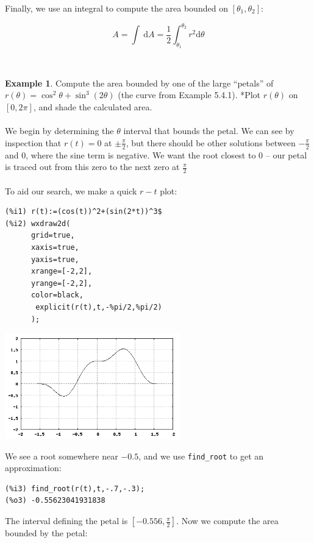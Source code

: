 \documentclass[10.5pt,twoside]{report}
\theoremstyle{definition}
\newtheorem{exmp}{Example}[section]
\begin{document}
Finally, we use an integral to compute the area bounded on $[\theta_1,\theta_2]$:

\[A=\int\ \mathrm{d}A =\frac{1}{2} \int_{\theta_1}^{\theta_2} r^2 \mathrm{d}\theta\]

${}$\\

\begin{exmp} Compute the area bounded by one of the large ``petals'' of $r(\theta)=\cos^2{\theta}+\sin^3{(2\theta)}$ (the curve from Example 5.4.1).  *Plot $r(\theta)$ on $[0,2\pi]$, and shade the calculated area.  \\

${}$\\

We begin by determining the $\theta$ interval that bounds the petal.  We can see by inspection that $r(t)=0$ at $\pm \frac{\pi}{2}$, but there should be other solutions between $-\frac{\pi}{2}$ and $0$, where the sine term is negative.  We want the root closest to $0$ -- our petal is traced out from this zero to the next zero at $\frac{\pi}{2}$\\
${}$\\
To aid our search, we make a quick $r-t$ plot:


\begin{verbatim}
(%i1) r(t):=(cos(t))^2+(sin(2*t))^3$
(%i2) wxdraw2d(
      grid=true,
      xaxis=true,
      yaxis=true,
      xrange=[-2,2],
      yrange=[-2,2],
      color=black,
       explicit(r(t),t,-%pi/2,%pi/2)
      );
\end{verbatim}

\includegraphics[width=3in]{example_5_4_3_1}

We see a root somewhere near $-0.5$, and we use \verb|find_root| to get an approximation:

\begin{verbatim}
(%i3) find_root(r(t),t,-.7,-.3);
(%o3) -0.55623041931838
\end{verbatim}

The interval defining the petal is $[-0.556,\frac{\pi}{2}]$.  Now we compute the area bounded by the petal:


\end{exmp}
\end{document}
